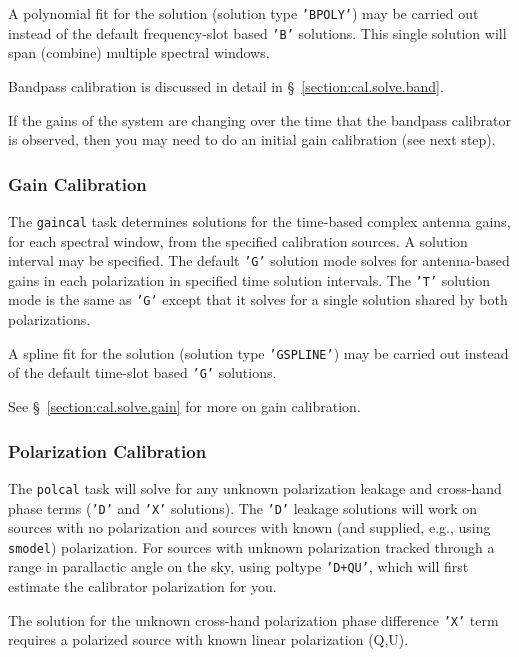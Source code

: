 A polynomial fit for the solution (solution type {\tt 'BPOLY'}) may be
carried out instead of the default frequency-slot based {\tt 'B'}
solutions.  This single solution will span (combine) multiple spectral
windows.

Bandpass calibration is discussed in detail in
\S~\ref{section:cal.solve.band}.

If the gains of the system are changing over the time that the
bandpass calibrator is observed, then you may need to do an initial
gain calibration (see next step).

\subsubsection{Gain Calibration}
\label{section:intro.walkthru.calib.gaincal}

The {\tt gaincal} task determines solutions for the time-based complex
antenna gains, for each spectral window, from the specified
calibration sources.  A solution interval may be specified. The
default {\tt 'G'} solution mode solves for antenna-based gains 
in each polarization in specified time solution intervals.  The {\tt 'T'}
solution mode is the same as {\tt 'G'} except that it solves for
a single solution shared by both polarizations.

A spline fit for the solution (solution type {\tt 'GSPLINE'}) may be
carried out instead of the default time-slot based {\tt 'G'} solutions.

See \S~\ref{section:cal.solve.gain} for more on gain calibration.

\subsubsection{Polarization Calibration}
\label{section:intro.walkthru.calib.polcal}

The {\tt polcal} task will solve for any unknown polarization leakage
and cross-hand phase terms ({\tt 'D'} and {\tt 'X'} solutions).  The
{\tt 'D'} leakage solutions will work on sources with no polarization and
sources with known (and supplied, e.g., using {\tt smodel}) polarization.
For sources with unknown polarization tracked through a range in parallactic 
angle on the sky, using poltype {\tt 'D+QU'}, which will first estimate
the calibrator polarization for you.

The solution for the unknown cross-hand polarization phase difference
{\tt 'X'} term requires a polarized source with known linear
polarization (Q,U).

